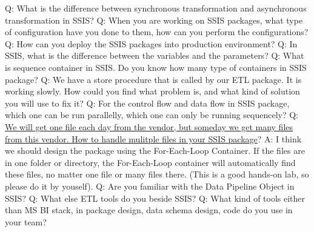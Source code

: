 \documentclass[a4paper,11pt]{article}
\begin{document}
\noindent 
Q: What is the difference between synchronous transformation and asynchronous transformation in SSIS? \newline \newline
\noindent 
Q: When you are working on SSIS packages, what type of configuration have you done to them, how can you perform the configurations? \newline \newline
\noindent 
Q: How can you deploy the SSIS packages into production environment? \newline \newline
\noindent 
Q: In SSIS, what is the difference between the variables and the parameters? \newline \newline
\noindent 
Q: What is sequence container in SSIS. Do you know how many type of containers in SSIS package? \newline \newline
\noindent 
Q: We have a store procedure that is called by our ETL package. It is working slowly. How could you find what problem is, and what kind of solution you will use to fix it?\newline \newline
\noindent 
Q: For the control flow and data flow in SSIS package, which one can be run parallelly, which one can only be running sequencely? \newline \newline
\noindent 
Q: \ul{We will get one file each day from the vendor, but someday we get many files from this vendor. How to handle mulitple files in your SSIS package}? \newline 
A: I think we should design the package using the For-Each-Loop Container. If the files are in one folder or directory, the For-Each-Loop container will automatically find these files, no matter one file or many files there. (This is a good hands-on lab, so please do it by youself).\newline\newline
\noindent 
Q: Are you familiar with the Data Pipeline Object in SSIS? \newline \newline
\noindent 
Q: What else ETL tools do you beside SSIS? \newline \newline
\noindent 
Q: What kind of tools either than MS BI stack, in package design, data schema design, code do you use in your team? \newline \newline
\end{document}
